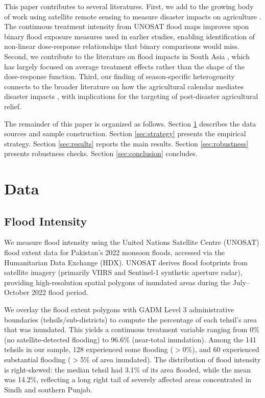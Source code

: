 \documentclass[12pt]{article}
\begin{document}
This paper contributes to several literatures. First, we add to the growing body of work using satellite remote sensing to measure disaster impacts on agriculture \citep{BurkeLobell2017, JeanEtAl2016, DonaldsonStoreygard2016}. The continuous treatment intensity from UNOSAT flood maps improves upon binary flood exposure measures used in earlier studies, enabling identification of non-linear dose-response relationships that binary comparisons would miss. Second, we contribute to the literature on flood impacts in South Asia \citep{MushfiqMobarak2014, TarazEtAl2018}, which has largely focused on average treatment effects rather than the shape of the dose-response function. Third, our finding of season-specific heterogeneity connects to the broader literature on how the agricultural calendar mediates disaster impacts \citep{LobellEtAl2011, SchlenkerRoberts2009, Fishman2018}, with implications for the targeting of post-disaster agricultural relief.

The remainder of this paper is organized as follows. Section \ref{sec:data} describes the data sources and sample construction. Section \ref{sec:strategy} presents the empirical strategy. Section \ref{sec:results} reports the main results. Section \ref{sec:robustness} presents robustness checks. Section \ref{sec:conclusion} concludes.

\section{Data}\label{sec:data}

\subsection{Flood Intensity}

We measure flood intensity using the United Nations Satellite Centre (UNOSAT) flood extent data for Pakistan's 2022 monsoon floods, accessed via the Humanitarian Data Exchange (HDX). UNOSAT derives flood footprints from satellite imagery (primarily VIIRS and Sentinel-1 synthetic aperture radar), providing high-resolution spatial polygons of inundated areas during the July--October 2022 flood period.

We overlay the flood extent polygons with GADM Level 3 administrative boundaries (tehsils/sub-districts) to compute the percentage of each tehsil's area that was inundated. This yields a continuous treatment variable ranging from 0\% (no satellite-detected flooding) to 96.6\% (near-total inundation). Among the 141 tehsils in our sample, 128 experienced some flooding ($>$0\%), and 60 experienced substantial flooding ($>$5\% of area inundated). The distribution of flood intensity is right-skewed: the median tehsil had 3.1\% of its area flooded, while the mean was 14.2\%, reflecting a long right tail of severely affected areas concentrated in Sindh and southern Punjab.
\end{document}
